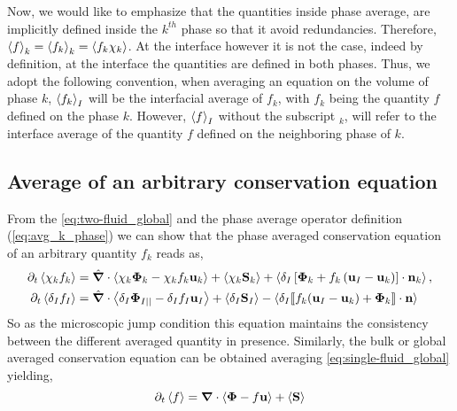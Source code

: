 Now, we would like to emphasize that the quantities inside phase average, are implicitly defined inside the $k^{th}$ phase so that it avoid redundancies.
Therefore, $\left<f\right>_k = \left<f_k\right>_k= \left<f_k\chi_k\right>$.
At the interface however it is not the case, indeed by definition, at the interface the quantities are defined in both phases.
Thus, we adopt the following convention, when averaging an equation on the volume of phase $k$, $\left<f_k\right>_I$ will be the interfacial average of $f_k$, with $f_k$ being the quantity $f$ defined on the phase $k$.
However, $\left<f\right>_I$ without the subscript $_k$, will refer to the interface average of the quantity $f$ defined on the neighboring phase of $k$.


\subsection{Average of an arbitrary conservation equation}

From the \ref{eq:two-fluid_global} and the phase average operator definition (\ref{eq:avg_k_phase}) we can show that the phase averaged conservation equation of an arbitrary quantity $f_k$ reads as,
\begin{align}
    \partial_t \left<\chi_k f_k\right>
    &= \hat{\bm{\nabla}} \cdot \left<\chi_k \bm{\Phi}_k - \chi_k f_k \textbf{u}_k\right>
    + \left<\chi_k \textbf{S}_k\right>
    + \left<\delta_I\left[
        \bm{\Phi}_k
        + f_k
        \left(
            \textbf{u}_I
            - \textbf{u}_k
        \right)
    \right]
    \cdot \textbf{n}_k\right> ,
    \label{eq:avg_dt_chif}\\
    \partial_t \left<\delta_If_I\right>
    &= 
    \hat{\bm{\nabla}} \cdot \left<\delta_I \mathbf{\Phi}_{I||} - \delta_I f_I \textbf{u}_I\right>
    +\left<\delta_I\textbf{S}_I\right> 
    - \left<\delta_I \llbracket 
    f_k (\textbf{u}_I - \textbf{u}_k)
    + \mathbf{\Phi}_k
     \rrbracket \cdot \textbf{n} \right>
    \label{eq:avg_dt_deltaf}
\end{align}
So as the microscopic jump condition this equation maintains the consistency between the different averaged quantity in presence.
Similarly, the bulk or global averaged conservation equation can be obtained averaging \ref{eq:single-fluid_global} yielding,
\begin{equation*}
    \partial_t \left<f\right>
    = \bm{\nabla} \cdot \left<\bm{\Phi} - f \textbf{u}\right>
    + \left<\textbf{S}\right>
    \label{eq:avg_global}
\end{equation*}


